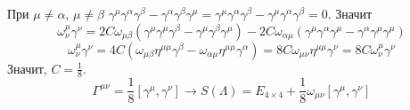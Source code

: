 \documentclass[12pt]{article}
\begin{document}
\begin{enumerate}
    При $\mu\neq\alpha$, $\mu\neq\beta$ $\gamma^\mu\gamma^\alpha\gamma^\beta-\gamma^\alpha\gamma^\beta\gamma^\mu=\gamma^\mu\gamma^\alpha\gamma^\beta-\gamma^\mu\gamma^\alpha\gamma^\beta=0$. Значит
    \begin{equation}
        \omega_\nu^\mu\gamma^\nu=2C\omega_{\mu\beta}(\gamma^\mu\gamma^\mu\gamma^\beta-\gamma^\mu\gamma^\beta\gamma^\mu)-2C\omega_{\alpha\mu}(\gamma^\mu\gamma^\alpha\gamma^\mu-\gamma^\alpha\gamma^\mu\gamma^\mu)
    \end{equation}
    \begin{equation}
        \omega_\nu^\mu\gamma^\nu=4C(\omega_{\mu\beta}\eta^{\mu\mu}\gamma^\beta-\omega_{\alpha\mu}\eta^{\mu\mu}\gamma^\alpha)=8C\omega_{\mu\nu}\eta^{\mu\mu}\gamma^\nu=8C\omega^\mu_\nu\gamma^\nu
    \end{equation}
    Значит, $C=\frac{1}{8}$.
    \begin{equation}
        \boxed{\Gamma^{\mu\nu}=\frac{1}{8}[\gamma^\mu,\gamma^\nu]}\rightarrow\boxed{S(\Lambda)=E_{4\times 4}+\frac{1}{8}\omega_{\mu\nu}[\gamma^\mu,\gamma^\nu]}
    \end{equation}
\end{enumerate}
\end{document}
